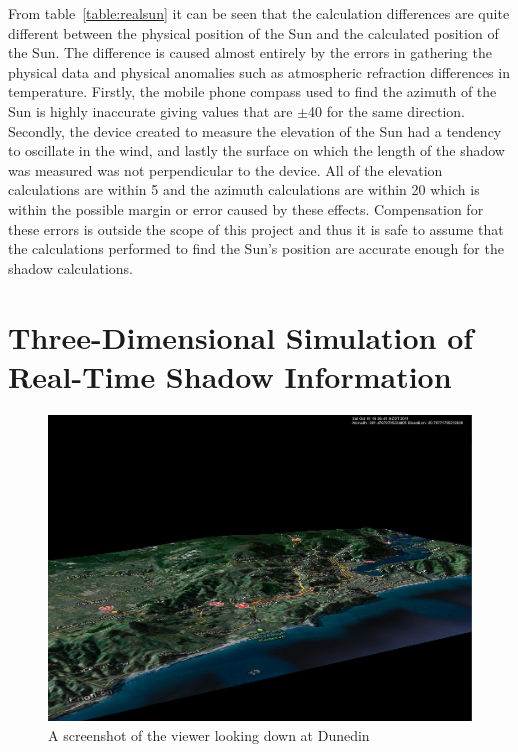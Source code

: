 \documentclass[12pt]{report}
\begin{document}
From table~\ref{table:realsun} it can be seen that the calculation differences are quite different between the physical position of the Sun and the calculated position of the Sun. The difference is caused almost entirely by the errors in gathering the physical data and physical anomalies such as atmospheric refraction differences in temperature. Firstly, the mobile phone compass used to find the azimuth of the Sun is highly inaccurate giving values that are $\pm$40{\degree} for the same direction. Secondly, the device created to measure the elevation of the Sun had a tendency to oscillate in the wind, and lastly the surface on which the length of the shadow was measured was not perpendicular to the device. All of the elevation calculations are within 5{\degree} and the azimuth calculations are within 20{\degree} which is within the possible margin or error caused by these effects. Compensation for these errors is outside the scope of this project and thus it is safe to assume that the calculations performed to find the Sun's position are accurate enough for the shadow calculations.

\chapter{Three-Dimensional Simulation of Real-Time Shadow Information}

\begin{figure}[h]
\centering
\includegraphics[scale=0.4]{viewer.png}
\caption{A screenshot of the viewer looking down at Dunedin}
\label{image:viewer}
\end{figure}
\end{document}
